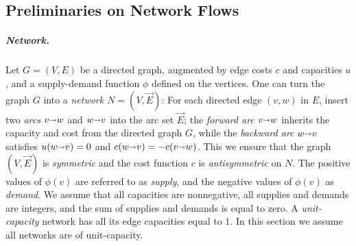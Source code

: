 \documentclass[a4paper,UKenglish]{socg-lipics-v2018}
\def\fsupply{\phi}
\def\arcto{\mathord\shortrightarrow}
\def\arc#1#2{#1\arcto#2}
\theoremstyle{plain}
\numberwithin{figure}{section}
\renewcommand{\paragraph}{\subparagraph}
\def\EMPH#1{\textcolor{BrickRed}{{\emph{#1}}}}
\begin{document}
\begin{toappendix}
\subsection{Preliminaries on Network Flows}
\label{SSA:prelim-flow}

\paragraph{Network.}
Let $G=(V,E)$ be a directed graph, augmented by edge costs $c$ and capacities $u$, and a supply-demand function $\fsupply$ defined on the vertices.
%
One can turn the graph $G$ into a \EMPH{network $N = (V, \vec{E})$}:
For each directed edge $(v,w)$ in $E$, insert two \EMPH{arcs} $\arc vw$ and $\arc wv$ into the arc set $\vec{E}$; the \EMPH{forward arc} $\arc vw$ inherits the capacity and cost from the directed graph $G$,
while the \EMPH{backward arc} $\arc wv$ satisfies $u(\arc wv) = 0$ and $c(\arc wv) = -c(\arc vw)$.  This we ensure that the graph $(V,\vec{E})$ is \emph{symmetric} and the cost function $c$ is \emph{antisymmetric} on $N$.
%
The positive values of $\fsupply(v)$ are referred to as \EMPH{supply}, and the negative values of $\fsupply(v)$ as \EMPH{demand}.
We assume that all capacities are nonnegative, all supplies and demands are integers, and the sum of supplies and demands is equal to zero.
%
A \EMPH{unit-capacity} network has all its edge capacities equal to $1$.
In this section we assume all networks are of unit-capacity.


\end{toappendix}
\end{document}
